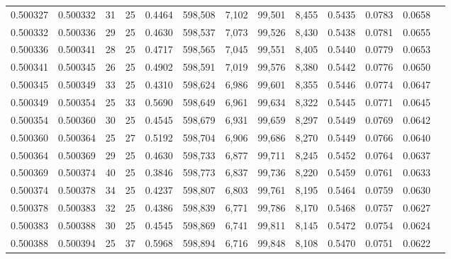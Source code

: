 \begin{tabular}{rrrrrrrrrrrrr}
0.500327 & 0.500332 &    31 &  25 &                                     0.4464 & 598,508 &   7,102 &  99,501 &   8,455 & 0.5435 & 0.0783 & 0.0658 \\
0.500332 & 0.500336 &    29 &  25 &                                     0.4630 & 598,537 &   7,073 &  99,526 &   8,430 & 0.5438 & 0.0781 & 0.0655 \\
0.500336 & 0.500341 &    28 &  25 &                                     0.4717 & 598,565 &   7,045 &  99,551 &   8,405 & 0.5440 & 0.0779 & 0.0653 \\
0.500341 & 0.500345 &    26 &  25 &                                     0.4902 & 598,591 &   7,019 &  99,576 &   8,380 & 0.5442 & 0.0776 & 0.0650 \\
0.500345 & 0.500349 &    33 &  25 &                                     0.4310 & 598,624 &   6,986 &  99,601 &   8,355 & 0.5446 & 0.0774 & 0.0647 \\
0.500349 & 0.500354 &    25 &  33 &                                     0.5690 & 598,649 &   6,961 &  99,634 &   8,322 & 0.5445 & 0.0771 & 0.0645 \\
0.500354 & 0.500360 &    30 &  25 &                                     0.4545 & 598,679 &   6,931 &  99,659 &   8,297 & 0.5449 & 0.0769 & 0.0642 \\
0.500360 & 0.500364 &    25 &  27 &                                     0.5192 & 598,704 &   6,906 &  99,686 &   8,270 & 0.5449 & 0.0766 & 0.0640 \\
0.500364 & 0.500369 &    29 &  25 &                                     0.4630 & 598,733 &   6,877 &  99,711 &   8,245 & 0.5452 & 0.0764 & 0.0637 \\
0.500369 & 0.500374 &    40 &  25 &                                     0.3846 & 598,773 &   6,837 &  99,736 &   8,220 & 0.5459 & 0.0761 & 0.0633 \\
0.500374 & 0.500378 &    34 &  25 &                                     0.4237 & 598,807 &   6,803 &  99,761 &   8,195 & 0.5464 & 0.0759 & 0.0630 \\
0.500378 & 0.500383 &    32 &  25 &                                     0.4386 & 598,839 &   6,771 &  99,786 &   8,170 & 0.5468 & 0.0757 & 0.0627 \\
0.500383 & 0.500388 &    30 &  25 &                                     0.4545 & 598,869 &   6,741 &  99,811 &   8,145 & 0.5472 & 0.0754 & 0.0624 \\
0.500388 & 0.500394 &    25 &  37 &                                     0.5968 & 598,894 &   6,716 &  99,848 &   8,108 & 0.5470 & 0.0751 & 0.0622 \\

\end{tabular}
